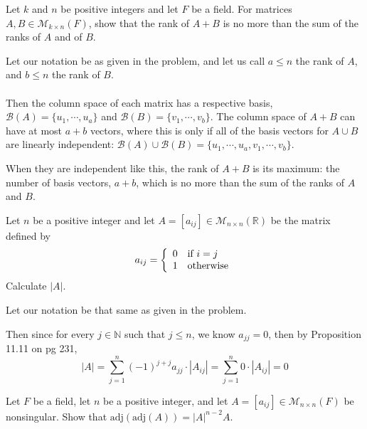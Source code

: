 \documentclass{article}
\begin{document}
\setcounter{problem}{621}
\begin{problem}
Let $k$ and $n$ be positive integers and let $F$ be a field. For matrices $A,B \in \mathcal{M}_{k\times n}(F)$, show that the rank of $A+B$ is no more than the sum of the ranks of $A$ and of $B$.
\end{problem}

\begin{solution}
Let our notation be as given in the problem, and let us call $a\le n$ the rank of $A$, and $b\le n$ the rank of $B$. 

\paragraph{}
Then the column space of each matrix has a respective basis, $\mathcal{B}(A) = \{ u_{1},\cdots,u_{a} \}$ and $\mathcal{B}(B) = \{ v_{1},\cdots,v_{b} \}$. The column space of $A+B$ can have at most $a+b$ vectors, where this is only if all of the basis vectors for $A\cup B$ are linearly independent: $\mathcal{B}(A) \cup \mathcal{B}(B) =  \{ u_{1},\cdots,u_{a} ,v_{1},\cdots,v_{b} \}$.

When they are independent like this, the rank of $A+B$ is its maximum: the number of basis vectors, $a+b$, which is no more than the sum of the ranks of $A$ and $B$.
\end{solution}

\setcounter{section}{11}
\setcounter{problem}{669}
\begin{problem}
Let $n$ be a positive integer and let $A=[a_{ij}] \in \mathcal{M}_{n\times n}(\mathbb{R})$ be the matrix defined by
\[
a_{ij} =
\left\{
\begin{array}{l l}
0 & \text{if }i=j\\
1 & \text{otherwise}
\end{array}
\right.
\]
Calculate $|A|$.
\end{problem}

\begin{solution}
Let our notation be that same as given in the problem.

Then since for every $j\in\mathbb{N}$ such that $j\le n$, we know $a_{jj}=0$, then by Proposition 11.11 on pg 231, 
\[
|A| = \sum_{j=1}^{n}(-1)^{j+j}a_{jj}\cdot|A_{ij}| = \sum_{j=1}^{n} 0\cdot|A_{ij}| = 0
\]
\end{solution}

\setcounter{problem}{682}
\begin{problem}
Let $F$ be a field, let $n$ be a positive integer, and let $A = [a_{ij}] \in \mathcal{M}_{n\times n}(F)$ be nonsingular. Show that $\text{adj}(\text{adj}(A)) = |A|^{n-2}A$.
\end{problem}
\end{document}
